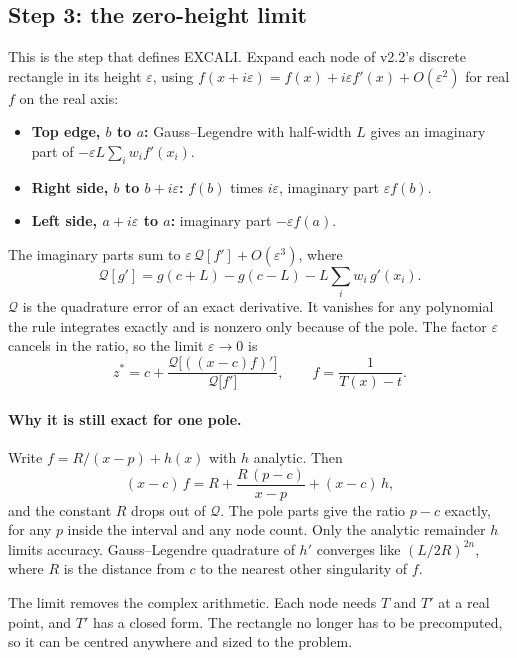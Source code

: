 \documentclass[11pt]{article}
\newcommand{\Q}{\mathcal{Q}}
\begin{document}
\subsection*{Step 3: the zero-height limit}
This is the step that defines EXCALI. Expand each node of v2.2's discrete rectangle in its height $\varepsilon$, using $f(x+i\varepsilon) = f(x) + i\varepsilon f'(x) + O(\varepsilon^2)$ for real $f$ on the real axis:
\begin{itemize}
  \item \textbf{Top edge, $b$ to $a$:} Gauss--Legendre with half-width $L$ gives an imaginary part of $-\varepsilon L\sum_i w_i f'(x_i)$.
  \item \textbf{Right side, $b$ to $b+i\varepsilon$:} $f(b)$ times $i\varepsilon$, imaginary part $\varepsilon f(b)$.
  \item \textbf{Left side, $a+i\varepsilon$ to $a$:} imaginary part $-\varepsilon f(a)$.
\end{itemize}
The imaginary parts sum to $\varepsilon\,\Q[f'] + O(\varepsilon^3)$, where
\begin{equation}
  \Q[g'] = g(c+L) - g(c-L) - L\sum_i w_i\,g'(x_i).
\end{equation}
$\Q$ is the quadrature error of an exact derivative. It vanishes for any polynomial the rule integrates exactly and is nonzero only because of the pole. The factor $\varepsilon$ cancels in the ratio, so the limit $\varepsilon\to0$ is
\begin{equation}
  \boxed{\;z^* = c + \frac{\Q\big[((x-c)f)'\big]}{\Q\big[f'\big]}, \qquad f = \frac{1}{T(x)-t}.\;}
\end{equation}

\paragraph{Why it is still exact for one pole.} Write $f = R/(x-p) + h(x)$ with $h$ analytic. Then
\[
  (x-c)\,f = R + \frac{R\,(p-c)}{x-p} + (x-c)\,h,
\]
and the constant $R$ drops out of $\Q$. The pole parts give the ratio $p-c$ exactly, for any $p$ inside the interval and any node count. Only the analytic remainder $h$ limits accuracy. Gauss--Legendre quadrature of $h'$ converges like $(L/2R)^{2n}$, where $R$ is the distance from $c$ to the nearest other singularity of $f$.

The limit removes the complex arithmetic. Each node needs $T$ and $T'$ at a real point, and $T'$ has a closed form. The rectangle no longer has to be precomputed, so it can be centred anywhere and sized to the problem.
\end{document}
